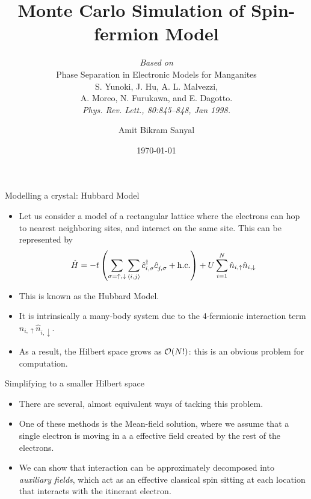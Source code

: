 \documentclass[]{beamer}
\title[]{Monte Carlo Simulation of Spin-fermion Model}
\subtitle{\emph{Based on}\\
Phase Separation in Electronic Models for Manganites\\
S. Yunoki, J. Hu, A. L. Malvezzi,\\ A. Moreo, N. Furukawa, and
E. Dagotto.\\
\emph{Phys. Rev. Lett., 80:845–848, Jan 1998.}
}
\author[A B Sanyal]{Amit Bikram Sanyal}
\date{\today}
\newcommand{\nhat}{\hat{n}}
\newcommand{\ham}{\hat{H}}
\begin{document}
\maketitle



\begin{frame}{Modelling a crystal: Hubbard Model}
\begin{itemize}
	\item Let us consider a model of a rectangular lattice where the electrons can hop to nearest neighboring sites, and interact on the same site. This can be represented by
	\begin{align}\label{eqn:tight-binding-hamil}
	\ham = -t \left(\sum_{\sigma = \uparrow, \downarrow} \sum_{\expval{i,j}}^{} \hat{c}^{\dagger}_{i, \sigma} \hat{c}^{}_{j, \sigma} + \mathrm{h.c.} \right) + U \sum_{i=1}^{N}\hat{n}_{i,\uparrow} \hat{n}_{i,\downarrow}
	\end{align}
	\item This is known as the Hubbard Model.
	\item It is intrinsically a many-body system due to the 4-fermionic interaction term $ \nhat_{i, \uparrow} \nhat_{i, \downarrow} $.
	\item As a result, the Hilbert space grows as $ \order{N!} $: this is an obvious problem for computation.
\end{itemize}
\end{frame}

\begin{frame}{Simplifying to a smaller Hilbert space}
\begin{itemize}
	\item There are several, almost equivalent ways of tacking this problem.
	\item One of these methods is the Mean-field solution, where we assume that a single electron is moving in a a effective field created by the rest of the electrons.
	\item We can show that interaction can be approximately decomposed into \emph{auxiliary fields}, which act as an effective classical spin sitting at each location that interacts with the itinerant electron.
\end{itemize}
\end{frame}
\end{document}
